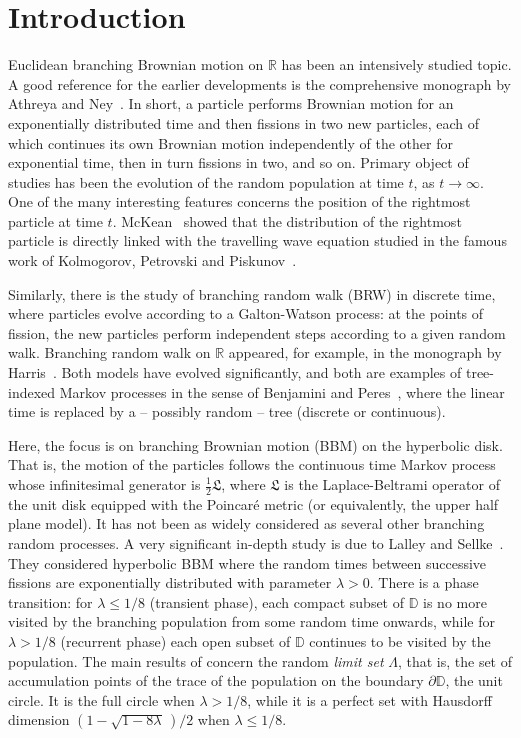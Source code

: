 \documentclass[12pt]{amsart}
\newcommand\DD{\mathbb D}
\newcommand\Lap{\mathfrak{L}}
\newcommand\Ls{\Lambda}
\newcommand\R{\mathbb R}
\numberwithin{theorem}{section}
\theoremstyle{definition}
\begin{document}
\baselineskip 15pt


\section{Introduction}


Euclidean branching Brownian motion on $\R$ has been an intensively studied topic.
A good reference for the earlier developments is the comprehensive monograph 
by {\sc Athreya and Ney}~\cite{AN}. In short, a particle performs Brownian motion for
an exponentially distributed time and then fissions in two new particles, each of which continues
its own Brownian motion independently of the other for exponential time, then in turn fissions in two,
and so on. Primary object of studies has been the evolution of the random population at time 
$t$, as $t \to \infty$. One of the many interesting features concerns the position of the rightmost
particle at time $t$.  {\sc McKean}~\cite{McK} showed that the distribution of
the rightmost particle is directly linked with the travelling wave equation studied in the famous work of 
{\sc Kolmogorov, Petrovski and Piskunov}~\cite{KPP}.

Similarly, there is the study of branching random walk (BRW) in discrete time, where particles 
evolve according to a Galton-Watson process: at the points of fission, the new particles perform 
independent steps according to a given random walk. Branching random walk on $\R$ appeared, 
for example, in the monograph by {\sc Harris}~\cite[\S III.16]{Ha}. 
Both models have evolved significantly, and both are examples of tree-indexed Markov processes
in the sense of {\sc Benjamini and Peres}~\cite{BP}, where the linear time 
is replaced by a -- possibly random -- tree (discrete or continuous).

Here, the focus is on branching Brownian motion (BBM) 
on the hyperbolic disk. That is, the motion of the particles follows the continuous time 
Markov process whose infinitesimal generator is $\frac12 \Lap$, where $\Lap$ is the Laplace-Beltrami
operator of the unit disk equipped with the Poincar\'e metric (or equivalently, 
the upper half plane model). It has not been as widely considered as several other branching
random processes. A very significant in-depth study is due to {\sc Lalley and Sellke}~\cite{LS}. They 
considered hyperbolic BBM where the random times between successive fissions are exponentially
distributed with parameter $\lambda > 0$. There is a phase transition: for $\lambda \le 1/8$
(transient phase), each compact subset of $\DD$ is no more visited by the branching population
from some random time onwards, while for $\lambda > 1/8$ (recurrent phase) each open subset 
of $\DD$ continues to be visited by the population. The main results of \cite{LS} concern the random
\emph{limit set} $\Ls$, that is, the set of accumulation points of the trace of the population on the 
boundary $\partial \DD$, the unit circle. It is the full circle when $\lambda > 1/8$, while it 
is a perfect set with Hausdorff dimension $(1-\sqrt{1-8\lambda}\,)/2$ when $\lambda \le 1/8$.
\end{document}
